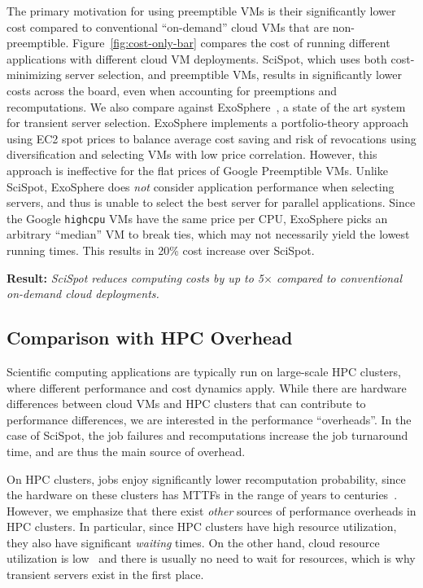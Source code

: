\documentclass[compsoc]{IEEEtran}
\newcommand{\sysname}{SciSpot\xspace}
\begin{document}
The primary motivation for using preemptible VMs is their significantly lower cost compared to conventional ``on-demand'' cloud VMs that are non-preemptible. 
Figure~\ref{fig:cost-only-bar} compares the cost of running different applications with different cloud VM deployments. 
\sysname, which uses both cost-minimizing server selection, and preemptible VMs, results in significantly lower costs across the board, even when accounting for preemptions and recomputations. 
We also compare against ExoSphere~\cite{exosphere}, a state of the art  system for transient server selection.
ExoSphere implements a portfolio-theory approach using EC2 spot prices to balance average cost saving and risk of revocations using diversification and selecting VMs with low price correlation.
However, this approach is ineffective for the flat prices of Google Preemptible VMs. 
Unlike \sysname, ExoSphere does \emph{not} consider application performance when selecting servers, and thus is unable to select the best server for parallel applications. 
Since the Google \texttt{highcpu} VMs have the same price per CPU, ExoSphere picks an arbitrary ``median'' VM to break ties, which may not necessarily yield the lowest running times.
This results in 20\% cost increase over \sysname. 

\noindent \textbf{Result:} \emph{SciSpot reduces computing costs by up to 5$\times$ compared to conventional on-demand cloud deployments.}


\subsection{Comparison with HPC Overhead}

Scientific computing applications are typically run on large-scale HPC clusters, where different performance and cost dynamics apply. 
While there are hardware differences between cloud VMs and HPC clusters that can contribute to performance differences, we are interested in the performance ``overheads''.
In the case of \sysname, the job failures and recomputations increase the job turnaround time, and are thus the main source of overhead. 

On HPC clusters, jobs enjoy significantly lower recomputation probability, since the hardware on these clusters has MTTFs in the range of years to centuries~\cite{dongarra_fault_nodate}.
However, we emphasize that there exist \emph{other} sources of performance overheads in HPC clusters.
In particular, since HPC clusters have high resource utilization, they also have significant \emph{waiting} times. 
On the other hand, cloud resource utilization is low~\cite{borg} and there is usually no need to wait for resources, which is why transient servers exist in the first place. 
\end{document}
